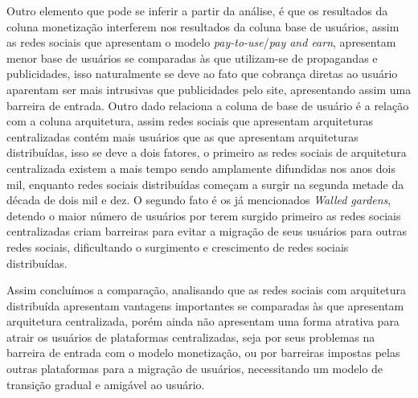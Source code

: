 Outro elemento que pode se inferir a partir da análise, é que os resultados  da coluna monetização interferem nos resultados da coluna base de usuários, assim as redes sociais que apresentam o modelo \textit{pay-to-use}/\textit{pay and earn}, apresentam menor base de usuários se comparadas às que utilizam-se de propagandas e publicidades, isso naturalmente se deve ao fato que cobrança diretas ao usuário aparentam ser mais intrusivas que publicidades pelo site, apresentando assim uma barreira de entrada. Outro dado relaciona a coluna de base de usuário é a relação com a coluna arquitetura, assim redes sociais que apresentam arquiteturas centralizadas contém mais usuários que as que apresentam arquiteturas distribuídas, isso se deve a dois fatores, o primeiro as redes sociais de arquitetura centralizada existem a mais tempo sendo amplamente difundidas nos anos dois mil, enquanto redes sociais distribuídas começam a surgir na segunda metade da década de dois mil e dez. O segundo fato é os já mencionados \textit{Walled gardens}, detendo o maior número de usuários por terem surgido primeiro as redes sociais centralizadas criam barreiras para evitar a migração de seus usuários para outras redes sociais, dificultando o surgimento e crescimento de redes sociais distribuídas.

Assim concluímos a comparação, analisando que as redes sociais com arquitetura distribuída apresentam vantagens importantes se comparadas às que apresentam arquitetura centralizada, porém ainda não apresentam uma forma atrativa para atrair os usuários de plataformas centralizadas, seja por seus problemas na barreira de entrada com o modelo monetização, ou por barreiras impostas pelas outras plataformas para a migração de usuários, necessitando um modelo de transição gradual e amigável ao usuário.


